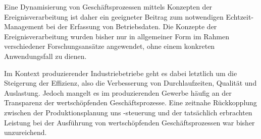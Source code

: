 Eine Dynamisierung von Geschäftsprozessen mittels Konzepten der Ereignisverarbeitung ist daher ein geeigneter Beitrag zum notwendigen Echtzeit-Management bei der Erfassung von Betriebsdaten. Die Konzepte der Ereignisverarbeitung wurden bisher nur in allgemeiner Form im Rahmen verschiedener Forschungsansätze angewendet, ohne einem konkreten Anwendungsfall zu dienen.
\cite{Krumeich.}

Im Kontext produzierender Industriebetriebe geht es dabei letztlich um die Steigerung der Effizienz, also die Verbesserung von Durchlaufzeiten, Qualität und Auslastung. 
Jedoch mangelt es im produzierenden Gewerbe häufig an der Transparenz der wertschöpfenden Geschäftsprozesse. 
Eine zeitnahe Rückkopplung zwischen der Produktionsplanung uns -steuerung und der tatsächlich erbrachten Leistung bei der Ausführung von wertschöpfenden Geschäftsprozessen war bisher unzureichend.
\cite{Grauer.2010}





